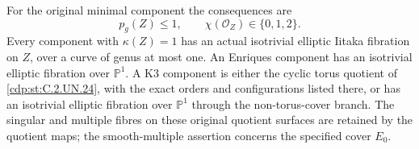 \begin{proposition}
For the original minimal component the consequences are
\[
 p_g(Z)\le1,
 \qquad \chi(\mathcal O_Z)\in\{0,1,2\}.
                                                               \tag{C.CS.1}\label{cdp:eq:C.CS.1}
\]
Every component with $\kappa(Z)=1$ has an actual
isotrivial elliptic Iitaka fibration on $Z$, over a
curve of genus at most one. An Enriques component
has an isotrivial elliptic fibration over $\mathbb P^1$.
A K3 component is either the cyclic torus quotient
of \ref{cdp:st:C.2.UN.24}, with the exact orders and configurations
listed there, or has an isotrivial elliptic fibration
over $\mathbb P^1$ through the non-torus-cover branch.
The singular and multiple fibres on these original
quotient surfaces are retained by the quotient maps;
the smooth-multiple assertion concerns the specified
cover $E_0$.
\end{proposition}

